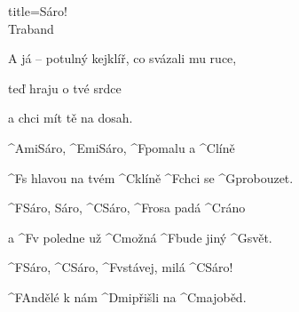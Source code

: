 \begin{song}{title=\centering Sáro! \\\normalsize Traband  \vspace*{-0.3cm}}
{\begin{minipage}[t]{0.48\textwidth}
	A já -- potulný kejklíř, co svázali mu ruce,

	teď hraju o tvé srdce
	
	a chci mít tě na dosah.

\sloka
	^{Ami}Sáro, ^{Emi}Sáro, ^{F}pomalu a ^{C}líně

	
	^{F}s hlavou na tvém ^{C}klíně ^{F}chci se ^{G}probouzet.
	
	^{F}Sáro, Sáro, ^{C}Sáro, ^{F}rosa padá ^{C}ráno
	
	a ^{F}v poledne už ^{C}možná ^{F}bude jiný ^{G}svět.

	^{F}Sáro, ^{C}Sáro, ^{F}vstávej, milá ^{C}Sáro!

	^{F}Andělé k nám ^{Dmi}přišli na ^{Cmaj}oběd.


\end{minipage}
}
\setcounter{Slokočet}{0}
\end{song}

